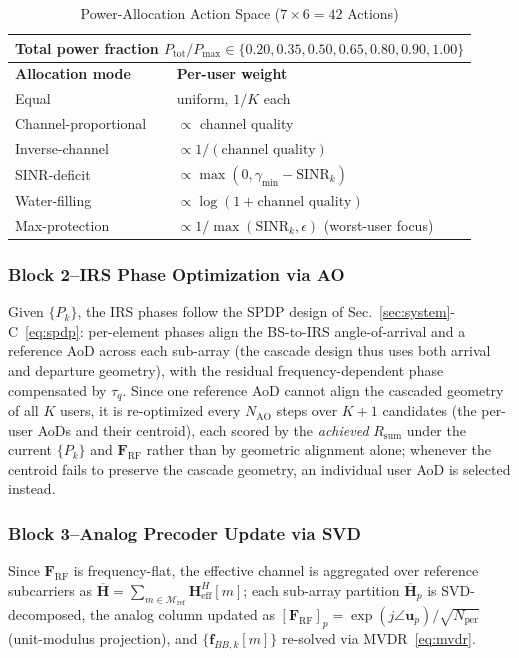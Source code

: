 \documentclass[10pt,conference]{IEEEtran}
\newcommand{\vect}[1]{\mathbf{#1}}
\newcommand{\mat}[1]{\mathbf{#1}}
\begin{document}
\begin{table}[t]
\centering
\caption{Power-Allocation Action Space ($7 \times 6 = 42$ Actions)}
\label{tab:actions}
\begin{tabular}{ll}
\toprule
\multicolumn{2}{l}{Total power fraction $P_{\mathrm{tot}}/P_{\max} \in \{0.20, 0.35, 0.50, 0.65, 0.80, 0.90, 1.00\}$} \\
\midrule
\textbf{Allocation mode} & \textbf{Per-user weight} \\
\midrule
Equal & uniform, $1/K$ each \\
Channel-proportional & $\propto$ channel quality \\
Inverse-channel & $\propto 1/(\text{channel quality})$ \\
SINR-deficit & $\propto \max(0,\gamma_{\min}{-}\text{SINR}_k)$ \\
Water-filling & $\propto \log(1{+}\text{channel quality})$ \\
Max-protection & $\propto 1/\max(\text{SINR}_k, \epsilon)$ (worst-user focus) \\
\bottomrule
\end{tabular}
\end{table}

\subsubsection{Block 2--IRS Phase Optimization via AO}
Given $\{P_k\}$, the IRS phases follow the SPDP design of Sec.~\ref{sec:system}-C~\eqref{eq:spdp}: per-element phases align the BS-to-IRS angle-of-arrival and a reference AoD across each sub-array (the cascade design thus uses both arrival and departure geometry), with the residual frequency-dependent phase compensated by $\tau_q$. Since one reference AoD cannot align the cascaded geometry of all $K$ users, it is re-optimized every $N_{\mathrm{AO}}$ steps over $K+1$ candidates (the per-user AoDs and their centroid), each scored by the \emph{achieved} $R_{\mathrm{sum}}$ under the current $\{P_k\}$ and $\mat{F}_{\text{RF}}$ rather than by geometric alignment alone; whenever the centroid fails to preserve the cascade geometry, an individual user AoD is selected instead.

\subsubsection{Block 3--Analog Precoder Update via SVD}
Since $\mat{F}_{\text{RF}}$ is frequency-flat, the effective channel is aggregated over reference subcarriers as $\overline{\mat{H}} = \sum_{m \in \mathcal{M}_{\text{ref}}} \vect{H}_{\text{eff}}^H[m]$; each sub-array partition $\overline{\mat{H}}_p$ is SVD-decomposed, the analog column updated as $[\mat{F}_{\text{RF}}]_p = \exp(j\angle\vect{u}_p)/\sqrt{N_{\text{per}}}$ (unit-modulus projection), and $\{\vect{f}_{BB,k}[m]\}$ re-solved via MVDR~\eqref{eq:mvdr}.
\end{document}
